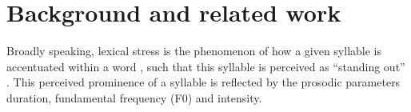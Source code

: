\documentclass[a4paper]{article}
\newcommand{\TODO}[1]{{\color{red}\textbf{[TODO #1]}}}
\begin{document}
	\section{Background and related work}
	\label{sec:bkgd}
	

Broadly speaking, lexical stress is the phenomenon of how a given syllable is accentuated within a word \cite{Cutler2005}, 
such that this syllable is perceived as ``standing out'' \cite{Dogil1999}. This perceived prominence of a syllable is 
reflected by the prosodic parameters duration, fundamental frequency (F0) and intensity.
\end{document}
